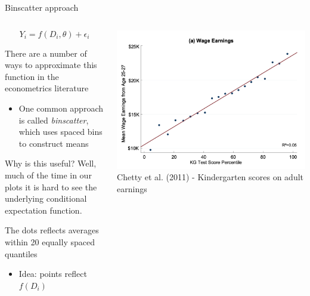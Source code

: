 \documentclass[notes,11pt, aspectratio=169]{beamer}
\newenvironment{wideitemize}{\itemize\addtolength{\itemsep}{10pt}}{\enditemize}
\begin{document}
\begin{frame}{Binscatter approach}
  \begin{columns}[T] %
    \begin{column}{.5\textwidth}
      $$ Y_{i} = f(D_{i},\theta) + \epsilon_{i}$$
      \vspace{-10pt}
  \begin{wideitemize}
  \item There are a number of ways to approximate this function in the econometrics literature
    \begin{itemize}
    \item One common approach is called \emph{binscatter}, which uses
      spaced bins to construct means
    \end{itemize}
  \item Why is this useful? Well, much of the time in our plots it is
    hard to see the underlying conditional expectation function.
  \item The dots reflects averages within 20 equally spaced quantiles
    \begin{itemize}
    \item Idea: points reflect $f(D_{i})$
    \end{itemize}
  \end{wideitemize}
  \end{column}%
  \hfill%
  \begin{column}{.5\textwidth}
\includegraphics[width=\linewidth]{first_binscatter.png}
Chetty et al. (2011) - Kindergarten scores on adult earnings
  \end{column}
\end{columns}
\end{frame}
\end{document}
